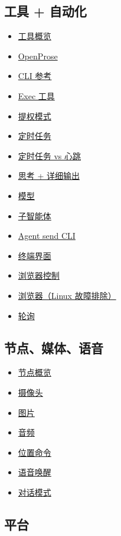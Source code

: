 \subsection{工具 + 自动化}


\begin{itemize}
  \item \href{/tools}{工具概览}
  \item \href{/prose}{OpenProse}
  \item \href{/cli}{CLI 参考}
  \item \href{/tools/exec}{Exec 工具}
  \item \href{/tools/elevated}{提权模式}
  \item \href{/automation/cron-jobs}{定时任务}
  \item \href{/automation/cron-vs-heartbeat}{定时任务 vs 心跳}
  \item \href{/tools/thinking}{思考 + 详细输出}
  \item \href{/concepts/models}{模型}
  \item \href{/tools/subagents}{子智能体}
  \item \href{/tools/agent-send}{Agent send CLI}
  \item \href{/web/tui}{终端界面}
  \item \href{/tools/browser}{浏览器控制}
  \item \href{/tools/browser-linux-troubleshooting}{浏览器（Linux 故障排除）}
  \item \href{/automation/poll}{轮询}
\end{itemize}


\subsection{节点、媒体、语音}


\begin{itemize}
  \item \href{/nodes}{节点概览}
  \item \href{/nodes/camera}{摄像头}
  \item \href{/nodes/images}{图片}
  \item \href{/nodes/audio}{音频}
  \item \href{/nodes/location-command}{位置命令}
  \item \href{/nodes/voicewake}{语音唤醒}
  \item \href{/nodes/talk}{对话模式}
\end{itemize}


\subsection{平台}


